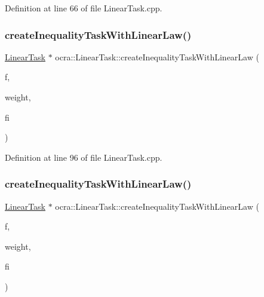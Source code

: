 Definition at line 66 of file Linear\+Task.\+cpp.

\hypertarget{classocra_1_1LinearTask_acdc8fcd9fb536eadb6713a6ed7104b0d}{}\label{classocra_1_1LinearTask_acdc8fcd9fb536eadb6713a6ed7104b0d} 
\subsubsection{\texorpdfstring{create\+Inequality\+Task\+With\+Linear\+Law()}{createInequalityTaskWithLinearLaw()}\hspace{0.1cm}{\footnotesize\ttfamily [2/5]}}
{\footnotesize\ttfamily \hyperlink{classocra_1_1LinearTask}{Linear\+Task} $\ast$ ocra\+::\+Linear\+Task\+::create\+Inequality\+Task\+With\+Linear\+Law (\begin{DoxyParamCaption}\item[{\hyperlink{classocra_1_1Function}{Function} $\ast$}]{f,  }\item[{const Vector\+Xd \&}]{weight,  }\item[{\hyperlink{namespaceocra_af4478308ca113669e67d72f9a3050469}{real}}]{fi }\end{DoxyParamCaption})\hspace{0.3cm}{\ttfamily [static]}}



Definition at line 96 of file Linear\+Task.\+cpp.

\hypertarget{classocra_1_1LinearTask_a22fa8cb968410219ffe92a90f4d4cd0f}{}\label{classocra_1_1LinearTask_a22fa8cb968410219ffe92a90f4d4cd0f} 
\subsubsection{\texorpdfstring{create\+Inequality\+Task\+With\+Linear\+Law()}{createInequalityTaskWithLinearLaw()}\hspace{0.1cm}{\footnotesize\ttfamily [3/5]}}
{\footnotesize\ttfamily \hyperlink{classocra_1_1LinearTask}{Linear\+Task} $\ast$ ocra\+::\+Linear\+Task\+::create\+Inequality\+Task\+With\+Linear\+Law (\begin{DoxyParamCaption}\item[{\hyperlink{classocra_1_1Function}{Function} $\ast$}]{f,  }\item[{\hyperlink{namespaceocra_af4478308ca113669e67d72f9a3050469}{real}}]{weight,  }\item[{const Vector\+Xd \&}]{fi }\end{DoxyParamCaption})\hspace{0.3cm}{\ttfamily [static]}}



